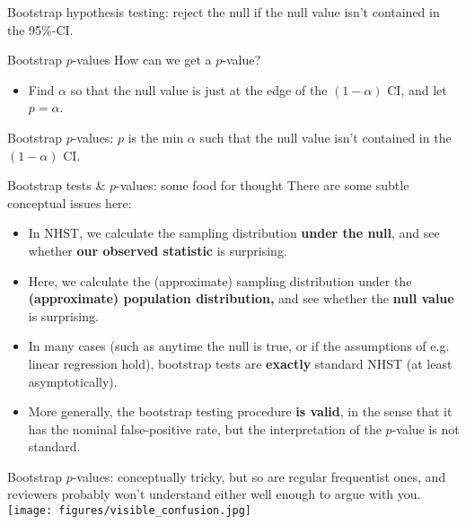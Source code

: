 \documentclass{beamer} %
\begin{document}
\begin{frame}[standout]
Bootstrap hypothesis testing: reject the null if the null value isn't contained in the 95\%-CI.
\end{frame}

\begin{frame}{Bootstrap $p$-values}
How can we get a $p$-value? 
\begin{itemize}
\item Find $\alpha$ so that the null value is just at the edge of the $(1-\alpha)$ CI,
 and let $p = \alpha$.
\end{itemize}
\end{frame}

\begin{frame}[standout]
Bootstrap $p$-values: $p$ is the min $\alpha$ such that the null value isn't contained in the $(1-\alpha)$ CI.
\end{frame}

\begin{frame}{Bootstrap tests \& $p$-values: some food for thought}
There are some subtle conceptual issues here:
\begin{itemize}[<+(1)->]
\item In NHST, we calculate the sampling distribution \textbf{under the null}, and see whether \textbf{our observed statistic} is surprising.
\item Here, we calculate the (approximate) sampling distribution under the \textbf{(approximate) population distribution,} and see whether the \textbf{null value} is surprising.
\item In many cases (such as anytime the null is true, or if the assumptions of e.g. linear regression hold), bootstrap tests are \textbf{exactly} standard NHST (at least asymptotically).
\item More generally, the bootstrap testing procedure \textbf{is valid}, in the sense that it has the nominal false-positive rate, but the interpretation of the $p$-value is not standard.  
\end{itemize}
\end{frame}

\begin{frame}[standout]
\vspace{1em}
Bootstrap $p$-values: conceptually tricky, but so are regular frequentist ones, and reviewers probably won't understand either well enough to argue with you. \\[0.5em]
\texttt{[image: figures/visible\_confusion.jpg]}
\end{frame}
\end{document}
